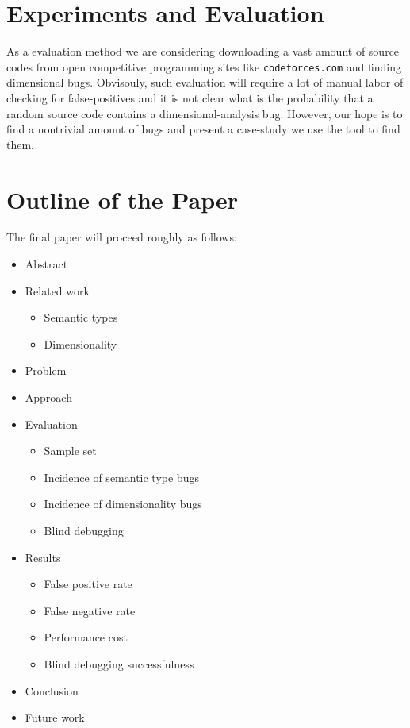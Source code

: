 \documentclass[12pt]{article}
\begin{document}
\section{Experiments and Evaluation}

As a evaluation method we are considering downloading a vast amount of source codes from open competitive programming sites like \texttt{codeforces.com} and finding dimensional bugs. Obvisouly, such evaluation will require a lot of manual labor of checking for false-positives and it is not clear what is the probability that a random source code contains a dimensional-analysis bug. However, our hope is to find a nontrivial amount of bugs and present a case-study we use the tool to find them.

\section{Outline of the Paper}

The final paper will proceed roughly as follows:

\begin{itemize}
\item Abstract
\item Related work
\begin{itemize}
	\item Semantic types
	\item Dimensionality
\end{itemize}
\item Problem
\item Approach
\item Evaluation
\begin{itemize}
	\item Sample set
	\item Incidence of semantic type bugs
	\item Incidence of dimensionality bugs
	\item Blind debugging
\end{itemize}
\item Results
\begin{itemize}
	\item False positive rate
	\item False negative rate
	\item Performance cost
	\item Blind debugging successfulness
\end{itemize}
\item Conclusion
\item Future work
\end{itemize}




\end{document}
